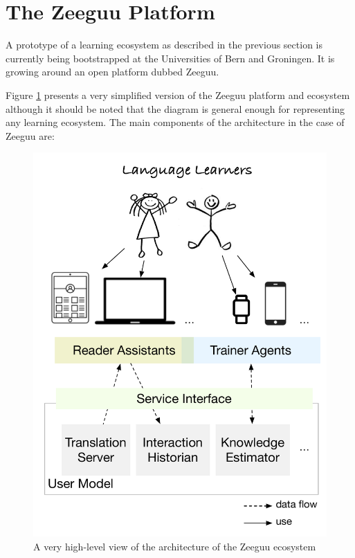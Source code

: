 

\section {The Zeeguu Platform}

A prototype of a learning ecosystem as described in the previous section is currently being bootstrapped at the Universities of Bern and Groningen. It is growing around an open platform dubbed Zeeguu. 

Figure \ref{fig:architecture} presents a very simplified version of the Zeeguu platform and ecosystem although it should be noted that the diagram is general enough for representing any learning ecosystem. The main components of the architecture in the case of Zeeguu are:

\begin{figure}[h!]
	\includegraphics[width=\linewidth]{images/zeeguu-architecture.pdf}
	\caption{A very high-level view of the architecture of the Zeeguu ecosystem}
	\label{fig:architecture}
\end{figure}


